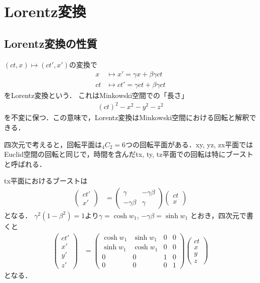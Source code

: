 \section{Lorentz変換}
\subsection{Lorentz変換の性質}
$(ct, x) \mapsto (ct', x')$の変換で
\begin{align}
		x &\mapsto x' = \gamma x + \beta \gamma ct\\
		ct &\mapsto ct' = \gamma ct + \beta\gamma ct
\end{align}
をLorentz変換という．
これはMinkowski空間での「長さ」
\begin{align}
		(ct)^2 - x^2 - y^2 - z^2
\end{align}
を不変に保つ．この意味で，Lorentz変換はMinkowski空間における回転と解釈できる．

四次元で考えると，回転平面は${}_4C_{2} = 6$つの回転平面がある．xy, yz, zx平面ではEuclid空間の回転と同じで，時間を含んだtx, ty, tz平面での回転は特にブーストと呼ばれる．

tx平面におけるブーストは
\begin{align}
		\begin{pmatrix}
				ct'\\
				x'
		\end{pmatrix}
		&=
		\begin{pmatrix}
				\gamma & -\gamma\beta\\
				-\gamma\beta & \gamma
		\end{pmatrix}
		\begin{pmatrix}
				ct\\
				x
		\end{pmatrix}
\end{align}
となる．
$\gamma^2 (1-\beta^2) = 1$より$\gamma = \cosh w_1$, $-\gamma\beta = \sinh w_1$
とおき，四次元で書くと
\begin{align}
		\begin{pmatrix}
				ct'\\
				x'\\
				y'\\
				z'
		\end{pmatrix}
		&=
		\begin{pmatrix}
				\cosh w_1 & \sinh w_1 & 0 & 0\\
				\sinh w_1 & \cosh w_1 & 0 & 0\\
				0 & 0 & 1 & 0\\
				0 & 0 & 0 & 1
		\end{pmatrix}
		\begin{pmatrix}
				ct\\
				x\\
				y\\
				z
		\end{pmatrix}
\end{align}
となる．

